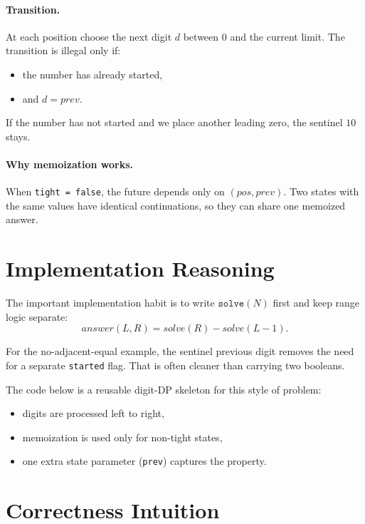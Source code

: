 \paragraph{Transition.}
At each position choose the next digit \(d\) between \(0\) and the current limit. The transition is illegal only if:

\begin{itemize}
  \item the number has already started,
  \item and \(d = prev\).
\end{itemize}

If the number has not started and we place another leading zero, the sentinel \(10\) stays.

\paragraph{Why memoization works.}
When \texttt{tight = false}, the future depends only on \((pos, prev)\). Two states with the same values have identical
continuations, so they can share one memoized answer.

\section*{Implementation Reasoning}

The important implementation habit is to write \(\texttt{solve}(N)\) first and keep range logic separate:
\[
answer(L,R) = solve(R) - solve(L-1).
\]

For the no-adjacent-equal example, the sentinel previous digit removes the need for a separate \texttt{started} flag.
That is often cleaner than carrying two booleans.

The code below is a reusable digit-DP skeleton for this style of problem:

\begin{itemize}
  \item digits are processed left to right,
  \item memoization is used only for non-tight states,
  \item one extra state parameter (\texttt{prev}) captures the property.
\end{itemize}

\section*{Correctness Intuition}

